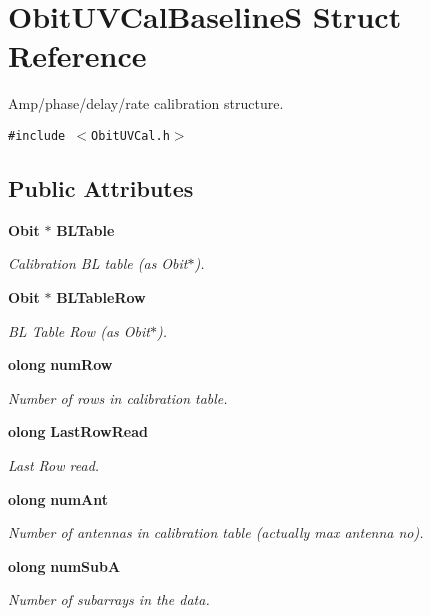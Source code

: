 \section{Obit\-UVCal\-Baseline\-S Struct Reference}
\label{structObitUVCalBaselineS}
Amp/phase/delay/rate calibration structure.  


{\tt \#include $<$Obit\-UVCal.h$>$}

\subsection*{Public Attributes}
\begin{CompactItemize}
\item 
{\bf Obit} $\ast$ {\bf BLTable}
\begin{CompactList}\small\item\em Calibration BL table (as Obit$\ast$). \item\end{CompactList}\item 
{\bf Obit} $\ast$ {\bf BLTable\-Row}
\begin{CompactList}\small\item\em BL Table Row (as Obit$\ast$). \item\end{CompactList}\item 
{\bf olong} {\bf num\-Row}
\begin{CompactList}\small\item\em Number of rows in calibration table. \item\end{CompactList}\item 
{\bf olong} {\bf Last\-Row\-Read}
\begin{CompactList}\small\item\em Last Row read. \item\end{CompactList}\item 
{\bf olong} {\bf num\-Ant}
\begin{CompactList}\small\item\em Number of antennas in calibration table (actually max antenna no). \item\end{CompactList}\item 
{\bf olong} {\bf num\-Sub\-A}
\begin{CompactList}\small\item\em Number of subarrays in the data. \item\end{CompactList}\item 

\end{CompactItemize}

